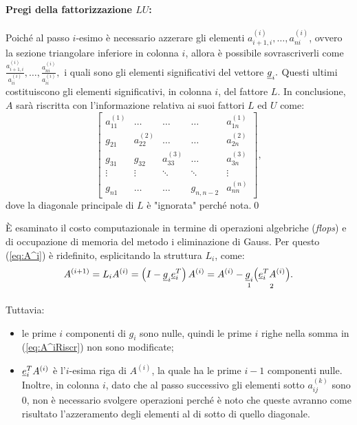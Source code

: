 \paragraph{Pregi della fattorizzazione $LU$:} Poiché al passo $i$-esimo è necessario azzerare gli elementi $a_{i+1,i}^{(i)}, \hdots, a_{ni}^{(i)}$, ovvero la sezione triangolare inferiore in colonna $i$, allora è possibile sovrascriverli come $\frac{a_{i+1,i}^{(i)}}{a_{ii}^{(i)}}, \hdots,\frac{a_{ni}^{(i)}}{a_{ii}^{(i)}},$ i quali sono gli elementi significativi del vettore $\uline g_i.$ Questi ultimi costituiscono gli elementi significativi, in colonna $i$, del fattore $L$.
In conclusione, $A$ sarà riscritta con l'informazione relativa ai suoi fattori $L$ ed $U$ come:
\begin{equation*}
    \begin{bmatrix}
        a_{11}^{(1)} &\hdots &\hdots &\hdots & a_{1n}^{(1)} \\
        g_{21} & a_{22}^{(2)} &\hdots &\hdots & a_{2n}^{(2)}\\
        g_{31} & g_{32} & a_{33}^{(3)} &\hdots & a_{3n}^{(3)}\\
        \vdots & \vdots & \ddots &\ddots & \vdots \\
        g_{n1} & \hdots & \hdots & g_{n, n-2} & a_{nn}^{(n)}
    \end{bmatrix},
\end{equation*}
dove la diagonale principale di $L$ è "ignorata" perché nota.\qed

È esaminato il costo computazionale in termine di operazioni algebriche (\textit{flops}) e di occupazione di memoria del metodo i eliminazione di Gauss. Per questo (\ref{eq:A^i}) è ridefinito, esplicitando la struttura $L_i$, come:
\begin{equation}\label{eq:A^iRiscr}
	A^{(i+1)} = L_iA^{(i)} = \left(I-\uline g_i \uline e_i^T\right)A^{(i)} = A^{(i)} - \underset{\footnotemark}{\uline g_i} \underset{\footnotemark}{\left(\uline e_i^T A^{(i)}\right)}.
\end{equation}

\addtocounter{footnote}{-1}


Tuttavia:
\begin{itemize}
	\item le prime $i$ componenti di $g_i$ sono nulle, quindi le prime $i$ righe nella somma in (\ref{eq:A^iRiscr}) non sono modificate;
	\item $\uline e_i^T A^{(i)}$ è l'$i$-esima riga di $A^{(i)}$, la quale ha le prime $i-1$ componenti nulle. Inoltre, in colonna $i$, dato che al passo successivo gli elementi sotto $a_{ij}^{(k)}$ sono 0, non è necessario svolgere operazioni perché è noto che queste avranno come risultato l'azzeramento degli elementi al di sotto di quello diagonale.
\end{itemize}

